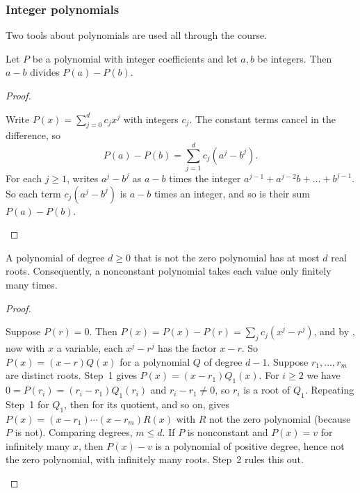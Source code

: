 \documentclass[10pt]{scrartcl}
\begin{document}
\subsubsection*{Integer polynomials}
Two tools about polynomials are used all through the course.

\begin{fact*}
  Let $P$ be a polynomial with integer coefficients and let $a, b$ be integers. Then $a - b$ divides $P(a) - P(b)$.
\end{fact*}
\begin{proof}
  \begin{steps}
    \ii Write $P(x) = \sum_{j=0}^{d} c_j x^j$ with integers $c_j$. The constant terms cancel in the difference, so
    \[ P(a) - P(b) = \sum_{j=1}^{d} c_j (a^j - b^j). \]
    \ii For each $j \geq 1$,  writes $a^j - b^j$ as $a - b$ times the integer $a^{j-1} + a^{j-2}b + \dots + b^{j-1}$.
    \ii So each term $c_j(a^j - b^j)$ is $a - b$ times an integer, and so is their sum $P(a) - P(b)$.
  \end{steps}
\end{proof}

\begin{fact*}
  A polynomial of degree $d \geq 0$ that is not the zero polynomial has at most $d$ real roots. Consequently, a nonconstant polynomial takes each value only finitely many times.
\end{fact*}
\begin{proof}
  \begin{steps}
    \ii Suppose $P(r) = 0$. Then $P(x) = P(x) - P(r) = \sum_j c_j(x^j - r^j)$, and by , now with $x$ a variable, each $x^j - r^j$ has the factor $x - r$. So $P(x) = (x - r)Q(x)$ for a polynomial $Q$ of degree $d - 1$.
    \ii Suppose $r_1, \dots, r_m$ are distinct roots. Step~1 gives $P(x) = (x - r_1)Q_1(x)$. For $i \geq 2$ we have $0 = P(r_i) = (r_i - r_1)Q_1(r_i)$ and $r_i - r_1 \neq 0$, so $r_i$ is a root of $Q_1$. Repeating Step~1 for $Q_1$, then for its quotient, and so on, gives $P(x) = (x-r_1)\cdots(x-r_m)R(x)$ with $R$ not the zero polynomial (because $P$ is not). Comparing degrees, $m \leq d$.
    \ii If $P$ is nonconstant and $P(x) = v$ for infinitely many $x$, then $P(x) - v$ is a polynomial of positive degree, hence not the zero polynomial, with infinitely many roots. Step~2 rules this out.
  \end{steps}
\end{proof}
\end{document}
